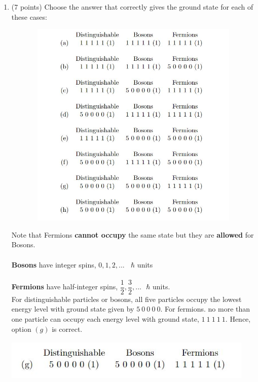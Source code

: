 \documentclass[fleqn]{article}
\begin{document}
  \begin{enumerate}
    \item (7 points) Choose the answer that correctly gives the ground state for each of these cases:
    \begin{center}
      \includegraphics[height=10cm, width=15cm]{1.JPG}
    \end{center}

      \textcolor{hwColor}{
        Note that Fermions \textbf{cannot occupy} the same state but they are
        \textbf{allowed} for Bosons.
        \\
        \\
        \textbf{Bosons} have integer spins, $0,1,2,... ~~~~ \hbar$ units
        \\
        \\
        \textbf{Fermions} have half-integer spins, $\dfrac{1}{2}, \dfrac{3}{2},... ~~~ \hbar$ units.
        \\
        For distinguishable particles or bosons, all five particles occupy the lowest 
        energy level with ground state given by $5 ~ 0 ~ 0 ~ 0 ~ 0$. For fermions. no more than 
        one particle can occupy each energy level with ground state, $1 ~ 1 ~ 1 ~ 1 ~ 1$. Hence, option 
        $(g)$ is correct.
      }
      \begin{center}
        \includegraphics[height=2cm, width=12cm]{Answer1.JPG}
      \end{center}


\end{enumerate}
\end{document}

